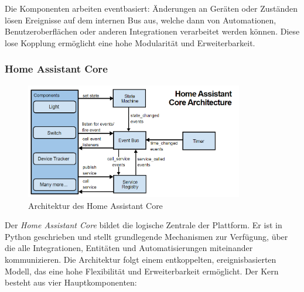 \vspace{0.5em}
\noindent
Die Komponenten arbeiten eventbasiert: Änderungen an Geräten oder Zuständen lösen Ereignisse auf dem internen Bus aus, welche dann von Automationen, Benutzeroberflächen oder anderen Integrationen verarbeitet werden können. Diese lose Kopplung ermöglicht eine hohe Modularität und Erweiterbarkeit.

\subsubsection{Home Assistant Core}

\begin{figure}[H]
  \centering
  \includegraphics[width=0.85\textwidth]{images/HA_core_architechture.png}
  \caption{Architektur des Home Assistant Core}
  \label{fig:ha-core-architecture}
\end{figure}
\vspace{0.5em}

Der \textit{Home Assistant Core} bildet die logische Zentrale der Plattform. Er ist in Python geschrieben und stellt grundlegende Mechanismen zur Verfügung, über die alle Integrationen, Entitäten und Automatisierungen miteinander kommunizieren. Die Architektur folgt einem entkoppelten, ereignisbasierten Modell, das eine hohe Flexibilität und Erweiterbarkeit ermöglicht. Der Kern besteht aus vier Hauptkomponenten:


